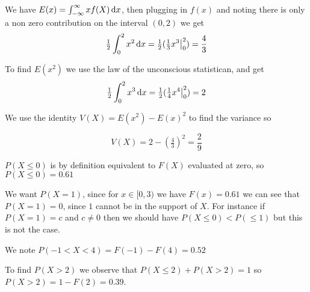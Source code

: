 \documentclass[11pt,largemargins]{homework}
\begin{document}
\question
\begin{alphaparts}
    \questionpart
    We have $E(x) = \int_{-\infty}^{\infty} xf(X) \dif x$, then plugging in $f(x)$ and noting there is only a non zero contribution 
    on the interval $(0, 2)$ we get 
    \[ \tfrac{1}{2} \int_{0}^{2} x^2 \dif x = \tfrac{1}{2} (\tfrac{1}{3}x^3 \big|_0^2) = \frac{4}{3} \]
    
    \questionpart
    To find $E(x^2)$ we use the law of the unconscious statistican, and get 
    \[ \tfrac{1}{2} \int_{0}^{2} x^3 \dif x = \tfrac{1}{2} (\tfrac{1}{4}x^4 \big|_0^2) = 2 \]

    \questionpart 
    We use the identity $V(X) = E(x^2) - E(x)^2$ to find the variance so 

    \[V(X) = 2 -(\tfrac{4}{3})^2 = \frac{2}{9} \] 

\end{alphaparts}

\newpage
\question

\begin{alphaparts}
    \questionpart
    $P(X \leq 0)$ is by definition equivalent to $F(X)$ evaluated at zero, so $P(X \leq 0) = 0.61$

    \questionpart
    We want $P(X = 1)$, since for $x \in [0, 3)$ we have $F(x) = 0.61$ we can see that $P(X = 1) = 0$, since $1$ cannot be in the support 
    of $X$. For instance if $P(X = 1) = c$ and $c \neq 0$ then we should have $P(X \leq 0) < P(\leq 1)$ but this is not the case. 

    \questionpart 
    We note  $P(-1 < X < 4) = F(-1) - F(4) = 0.52$ 

    \questionpart 
    To find $P(X > 2)$ we observe that $P(X \leq 2) + P(X > 2) = 1$ so $P(X > 2) = 1 - F(2) = 0.39$.  
\end{alphaparts}
\end{document}
